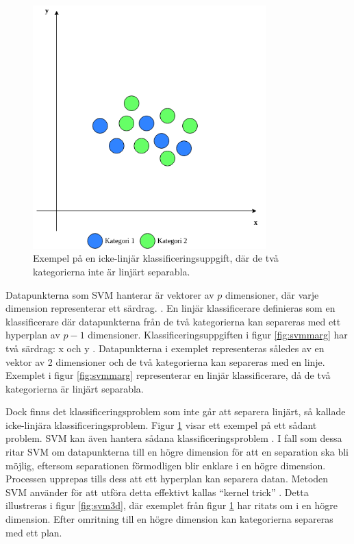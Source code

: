 \documentclass{kaumasters} %
\begin{document}
\begin{figure}[H]
\includegraphics[width=9cm]{nonlinearsvm}
\centering
\caption{Exempel på en icke-linjär klassificeringsuppgift, där de två kategorierna inte är linjärt separabla.}
\label{fig:svmnonl}
\end{figure} 

Datapunkterna som SVM hanterar är vektorer av $p$ dimensioner, där varje dimension representerar ett särdrag. \cite{svm:002}. En linjär klassificerare definieras som en klassificerare där datapunkterna från de två kategorierna kan separeras med ett hyperplan av $p-1$ dimensioner. Klassificeringsuppgiften i figur \ref{fig:svmmarg} har två särdrag: x och y \cite{svm:005}. Datapunkterna i exemplet representeras således av en vektor av 2 dimensioner och de två kategorierna kan separeras med en linje. Exemplet i figur \ref{fig:svmmarg} representerar en linjär klassificerare, då de två kategorierna är linjärt separabla. 

Dock finns det klassificeringsproblem som inte går att separera linjärt, så kallade icke-linjära klassificeringsproblem. Figur \ref{fig:svmnonl} visar ett exempel på ett sådant problem. SVM kan även hantera sådana klassificeringsproblem \cite{svm:002}. I fall som dessa ritar SVM om datapunkterna till en högre dimension för att en separation ska bli möjlig, eftersom separationen förmodligen blir enklare i en högre dimension. Processen upprepas tills dess att ett hyperplan kan separera datan. Metoden SVM använder för att utföra detta effektivt kallas “kernel trick” \cite{svm:004}. Detta illustreras i figur \ref{fig:svm3d}, där exemplet från figur \ref{fig:svmnonl} har ritats om i en högre dimension. Efter omritning till en högre dimension kan kategorierna separeras med ett plan. 
\end{document}
